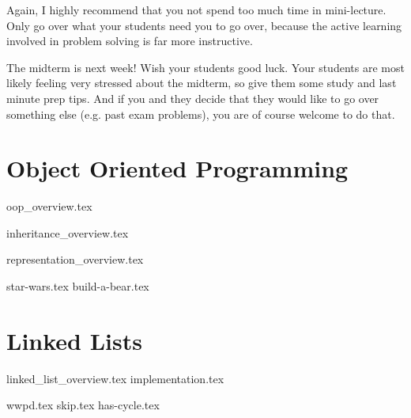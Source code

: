 \documentclass{exam}
\begin{document}
\begin{meta}
Again, I highly recommend that you not spend too much time in mini-lecture. Only go over what your students need you to go over, because the active learning involved in problem solving is far more instructive. 

The midterm is next week! Wish your students good luck. Your students are most likely feeling very stressed about the midterm, so give them some study and last minute prep tips. And if you and they decide that they would like to go over something else (e.g. past exam problems), you are of course welcome to do that. 
\end{meta}

\section{Object Oriented Programming}
{oop_overview.tex}

{inheritance_overview.tex}

{representation_overview.tex}
\newpage
\begin{questions}
{star-wars.tex}
\newpage
{build-a-bear.tex}
\end{questions}

\newpage
\section{Linked Lists}
{linked_list_overview.tex}
{implementation.tex}

\begin{questions}
	{wwpd.tex}
	\newpage
	{skip.tex}
	{has-cycle.tex}
\end{questions}
\end{document}

